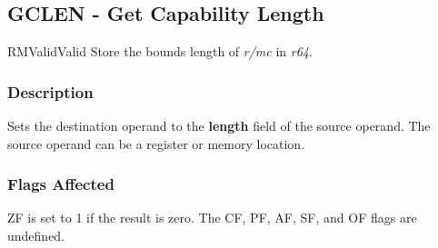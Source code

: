 \clearpage
{}
{}
\subsection*{GCLEN - Get Capability Length}

\begin{x86opcodetable}
  {RM}{Valid}{Valid}
  {Store the bounds length of \emph{r/mc} in \emph{r64}.}
\end{x86opcodetable}

\begin{x86opentable}
\end{x86opentable}

\subsubsection*{Description}

Sets the destination operand to the \textbf{length} field of the
source operand.  The source operand can be a register or memory
location.

\subsubsection*{Flags Affected}

ZF is set to 1 if the result is zero.  The CF, PF, AF, SF, and OF
flags are undefined.
